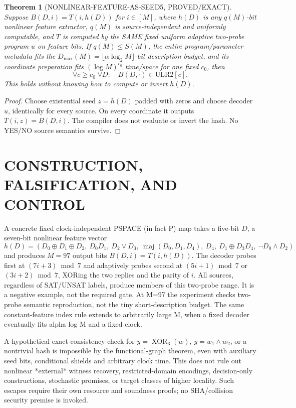 \documentclass[11pt]{article}
\newtheorem{theorem}{Theorem}
\begin{document}
\begin{theorem}[NONLINEAR-FEATURE-AS-SEED5, PROVED/EXACT]
Suppose $B(D,i)=T(i,h(D))$ for $i\in[M]$, where $h(D)$ is any $q(M)$-bit nonlinear feature extractor, $q(M)$ is source-independent and uniformly computable, and $T$ is computed by the SAME fixed uniform adaptive two-probe program $u$ on feature bits. If $q(M)\le S(M)$, the entire program/parameter metadata fits the $D_{\max}(M)=\lfloor\alpha\log_2M\rfloor$-bit description budget, and its coordinate preparation fits $(\log M)^{c_0}$ time/space for one fixed $c_0$, then
\[
\forall c\ge c_0\;\forall D:\quad B(D,\cdot)\in\mathrm{ULR2}[c].
\tag{2}
\]
This holds without knowing how to compute or invert $h(D)$.
\end{theorem}
\begin{proof}
Choose existential seed $z=h(D)$ padded with zeros and choose decoder $u$, identically for every source. On every coordinate it outputs $T(i,z)=B(D,i)$. The compiler does not evaluate or invert the hash. No YES/NO source semantics survive.
\end{proof}

\section{CONSTRUCTION, FALSIFICATION, AND CONTROL}
A concrete fixed clock-independent PSPACE (in fact P) map takes a five-bit $D$, a seven-bit nonlinear feature vector
\[
h(D)=(D_0\oplus D_1\oplus D_2,\ D_0D_1,\ D_2\lor D_3,\
\operatorname{maj}(D_0,D_1,D_4),\ D_4,\ D_1\oplus D_3D_4,\ \neg D_0\land D_2)
\]
and produces $M=97$ output bits $B(D,i)=T(i,h(D))$. The decoder probes first at $(7i+3)\bmod7$ and adaptively probes second at $(5i+1)\bmod7$ or $(3i+2)\bmod7$, XORing the two replies and the parity of $i$. All sources, regardless of SAT/UNSAT labels, produce members of this two-probe range. It is a negative example, not the required gate. At M=97 the experiment checks two-probe semantic reproduction, not the tiny short-description budget. The same constant-feature index rule extends to arbitrarily large M, when a fixed decoder eventually fits alpha log M and a fixed clock.

A hypothetical exact consistency check for $y=\operatorname{XOR}_3(w)$, $y=w_1\land w_2$, or a nontrivial hash is impossible by the functional-graph theorem, even with auxiliary seed bits, conditional shields and arbitrary clock time. This does not rule out nonlinear *external* witness recovery, restricted-domain encodings, decision-only constructions, stochastic promises, or target classes of higher locality. Such escapes require their own resource and soundness proofs; no SHA/collision security premise is invoked.
\end{document}
